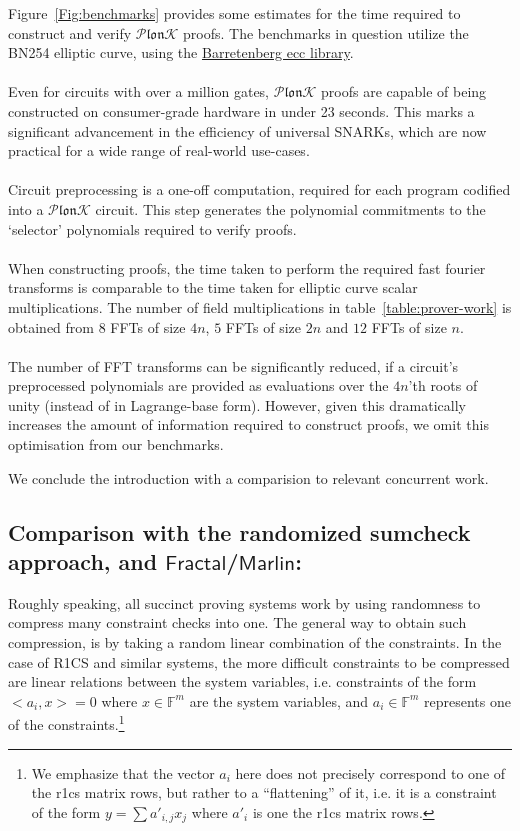 \documentclass[11pt]{article} %
\newcommand{\plonk}{\ensuremath{\mathcal{P} \mathfrak{lon}\mathcal{K}}\xspace}
\newcommand{\F}{\ensuremath{\mathbb F}\xspace}
\newcommand{\marlin}{\ensuremath{\mathsf{Marlin}}\xspace}
\newcommand{\fractal}{\ensuremath{\mathsf{Fractal}}\xspace}
\begin{document}
Figure~\ref{Fig:benchmarks} provides some estimates for the time required to construct and verify \plonk proofs. The benchmarks in question utilize the BN254 elliptic curve, using the \href{https://github.com/AztecProtocol/barretenberg}{Barretenberg ecc library}.
\\
\\
Even for circuits with over a million gates, \plonk proofs are capable of being constructed on consumer-grade hardware in under 23 seconds. This marks a significant advancement in the efficiency of universal SNARKs, which are now practical for a wide range of real-world use-cases.
\\
\\
Circuit preprocessing is a one-off computation, required for each program codified into a \plonk circuit. This step generates the polynomial commitments to the `selector' polynomials required to verify proofs.
\\
\\
When constructing proofs, the time taken to perform the required fast fourier transforms is comparable to the time taken for elliptic curve scalar multiplications. The number of field multiplications in table~\ref{table:prover-work} is obtained from $8$ FFTs of size $4n$, $5$ FFTs of size $2n$ and $12$ FFTs of size $n$.
\\
\\
The number of FFT transforms can be significantly reduced, if a circuit's preprocessed polynomials are provided as evaluations over the $4n$'th roots of unity (instead of in Lagrange-base form). However, given this dramatically increases the amount of information required to construct proofs, we omit this optimisation from our benchmarks.




We conclude the introduction with a comparision to relevant concurrent work.

\subsection{Comparison with the randomized sumcheck approach, and \fractal/\marlin:}
Roughly speaking, all succinct proving systems work by using randomness to compress many constraint checks into one.
The general way to obtain such compression, is by taking a random linear combination of the constraints.
In the case of R1CS and similar systems, the more difficult constraints to be compressed are linear relations between the system variables, i.e. constraints of the form
$<a_i,x>=0$ where $x\in \F^m$ are the system variables, and $a_i\in \F^m$ represents one of the constraints.\footnote{We emphasize that the vector $a_i$ here does not precisely correspond to one of the r1cs matrix rows, but rather to a ``flattening'' of it, i.e. it is a constraint of the form $y=\sum a'_{i,j} x_j$ where $a'_i$ is one the r1cs matrix rows.}
\end{document}

